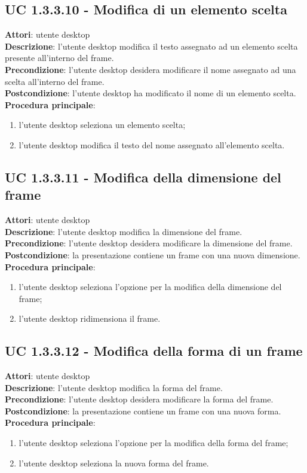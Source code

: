 \subsection{UC 1.3.3.10 - Modifica di un elemento scelta}{
	\label{uc1.3.3.10}
	\textbf{Attori}: utente desktop \\
	\textbf{Descrizione}: l'utente desktop modifica il testo assegnato ad un elemento scelta presente all'interno del frame. \\
	\textbf{Precondizione}: l'utente desktop desidera modificare il nome assegnato ad una scelta all'interno del frame.	\\
	\textbf{Postcondizione}: l'utente desktop ha modificato il nome di un elemento scelta.	\\
	\textbf{Procedura principale}:
	\begin{enumerate}
		\item l'utente desktop seleziona un elemento scelta;
		\item l'utente desktop modifica il testo del nome assegnato all'elemento scelta.
	\end{enumerate}
	}
\subsection{UC 1.3.3.11 - Modifica della dimensione del frame}{
	\label{uc1.3.3.11}
	\textbf{Attori}: utente desktop \\
	\textbf{Descrizione}: l'utente desktop modifica la dimensione del frame. \\
	\textbf{Precondizione}: l'utente desktop desidera modificare la dimensione del frame.	\\
	\textbf{Postcondizione}: la presentazione contiene un frame con una nuova dimensione.	\\
	\textbf{Procedura principale}:
	\begin{enumerate}
		\item l'utente desktop seleziona l'opzione per la modifica della dimensione del frame;
		\item l'utente desktop ridimensiona il frame.
	\end{enumerate}
	}
\subsection{UC 1.3.3.12 - Modifica della forma di un frame}{
	\label{uc1.3.3.12}
	\textbf{Attori}: utente desktop \\
	\textbf{Descrizione}: l'utente desktop modifica la forma del frame. \\
	\textbf{Precondizione}: l'utente desktop desidera modificare la forma del frame.	\\
	\textbf{Postcondizione}: la presentazione contiene un frame con una nuova forma.	\\
	\textbf{Procedura principale}:
	\begin{enumerate}
		\item l'utente desktop seleziona l'opzione per la modifica della forma del frame;
		\item l'utente desktop seleziona la nuova forma del frame.
	\end{enumerate}
	}
